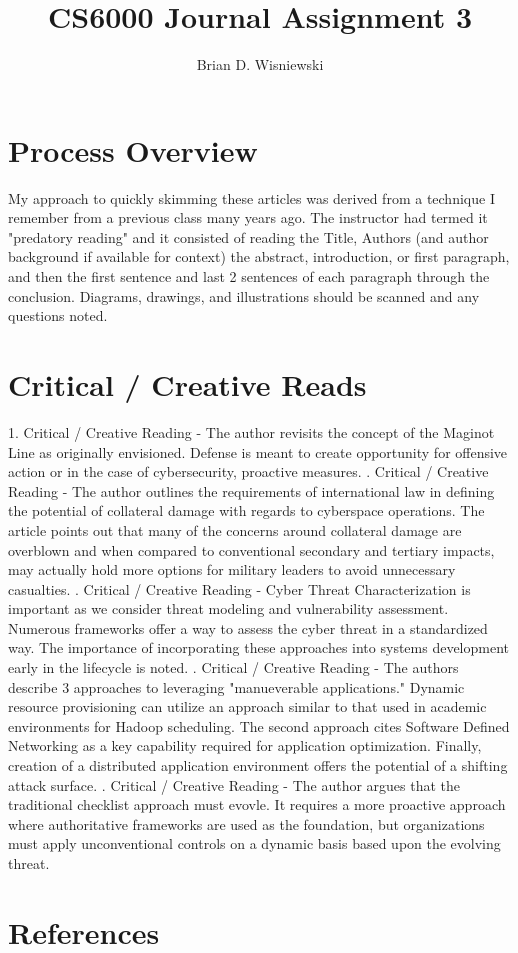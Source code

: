 \documentclass[a4paper.12pt] {article}
\begin{document}
\title{CS6000 Journal Assignment 3}
\author{Brian D. Wisniewski}
\maketitle

\section{Process Overview}

My approach to quickly skimming these articles was derived from a technique I remember from a previous class many years ago.  The instructor had termed it "predatory reading" and it consisted of reading the Title, Authors (and author background if available for context) the abstract, introduction, or first paragraph, and then the first sentence and last 2 sentences of each paragraph through the conclusion.  Diagrams, drawings, and illustrations should be scanned and any questions noted.  

\section{Critical / Creative Reads}

1. Critical / Creative Reading - The author revisits the concept of the Maginot Line as originally envisioned.  Defense is meant to create opportunity for offensive action or in the case of cybersecurity, proactive measures. \cite{r3}
. Critical / Creative Reading - The author outlines the requirements of international law in defining the potential of collateral damage with regards to cyberspace operations.  The article points out that many of the concerns around collateral damage are overblown and when compared to conventional secondary and tertiary impacts, may actually hold more options for military leaders to avoid unnecessary casualties. \cite{r5}
. Critical / Creative Reading - Cyber Threat Characterization is important as we consider threat modeling and vulnerability assessment.  Numerous frameworks offer a way to assess the cyber threat in a standardized way.  The importance of incorporating these approaches into systems development early in the lifecycle is noted.\cite{r7}
. Critical / Creative Reading - The authors describe 3 approaches to leveraging "manueverable applications."  Dynamic resource provisioning can utilize an approach similar to that used in academic environments for Hadoop scheduling. The second approach cites Software Defined Networking as a key capability required for application optimization.  Finally, creation of a distributed application environment offers the potential of a shifting attack surface.\cite{r9}
. Critical / Creative Reading - The author argues that the traditional checklist approach must evovle.  It requires a more proactive approach where authoritative frameworks are used as the foundation, but organizations must apply unconventional controls on a dynamic basis based upon the evolving threat. \cite{r14}
\newline

\section{References}
\nocite{*}


\end{document}
